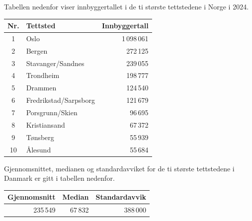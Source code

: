 \newpage
{}
Tabellen nedenfor viser innbyggertallet i de ti største tettstedene i Norge i 2024.

\begin{table}[h]
	\centering
	\begin{tabular}{cl r}
		\hline
		Nr. & Tettsted & Innbyggertall \\
		\hline
		1  & Oslo                    & 1\,098\,061 \\ \hline
		2  & Bergen                  & 272\,125 \\ \hline
		3  & Stavanger/Sandnes       & 239\,055 \\ \hline
		4  & Trondheim               & 198\,777 \\ \hline
		5  & Drammen                 & 124\,540 \\ \hline
		6  & Fredrikstad/Sarpsborg   & 121\,679 \\ \hline
		7  & Porsgrunn/Skien         & 96\,695 \\ \hline
		8  & Kristiansand            & 67\,372 \\ \hline
		9  & Tønsberg                & 55\,939 \\ \hline
		10 & Ålesund                 & 55\,684 \\
		\hline
	\end{tabular}
\end{table}


Gjennomsnittet, medianen og standardavviket for de ti største tettstedene i Danmark er gitt i tabellen nedenfor.

\begin{table}[h]
	\centering
	\begin{tabular}{|r |r |r|}
		\hline
		Gjennomsnitt & Median & Standardavvik \\ 
		\hline
		235\,549 & 67\,832 & 388\,000 \\ \hline
	\end{tabular}
\end{table}

